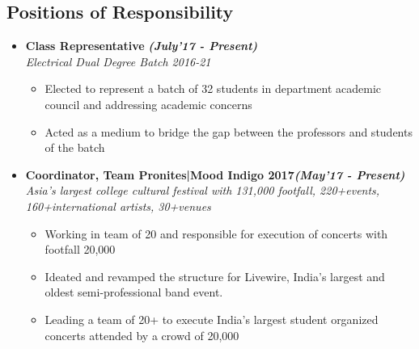 \documentclass[11pt]{resume}
\begin{document}
\begin{resume}
\begin{itemize}
\section{\mysidestyle Positions of Responsibility}
\begin{itemize}
\item \textbf{Class Representative} \hfill \emph{\textbf{(July'17 - Present)}}  \\
\emph{ Electrical Dual Degree Batch 2016-21} \\[-0.6cm]
\begin{itemize}\itemsep \isep
\item Elected to represent a batch of 32 students in department academic council and addressing academic concerns
\item Acted as a medium to bridge the gap between the professors and students of the batch
\end{itemize}
        
\end{itemize}

\vspace{-4mm}

 \begin{itemize}
 \item \textbf{Coordinator, Team Pronites|Mood Indigo 2017}\hfill \emph{\textbf{(May'17 - Present)}}\\
 \emph{Asia’s largest college cultural festival with 131,000 footfall, 220+events, 160+international artists, 30+venues} \\[-0.6cm]
 \begin{itemize}\itemsep \isep
 \item Working in team of 20 and responsible for execution of concerts with footfall 20,000
 \item Ideated and revamped the structure for Livewire, India's largest and oldest semi-professional band event.
 \item Leading a  team of 20+ to execute India’s largest student organized concerts attended by a crowd of 20,000
 \end{itemize}

        
\end{itemize}
   





\end{itemize}
\end{resume}
\end{document}
